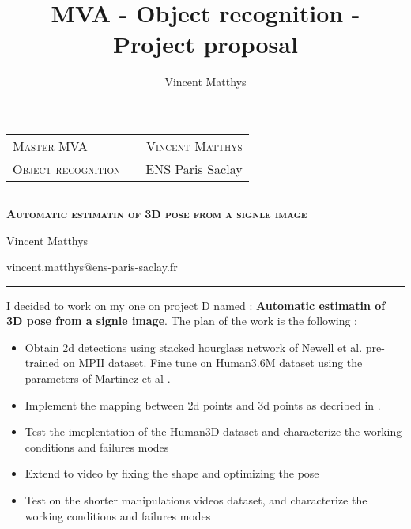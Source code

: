 \documentclass[12pt,a4paper,onecolumn]{article}
\title{MVA - Object recognition - Project proposal}
\author{Vincent Matthys}
\begin{document}
\begin{tabularx}{0.9\textwidth}{@{} l X r @{} }
	{\textsc{Master MVA}}       &  & \textsc{Vincent Matthys} \\
	\textsc{Object recognition} &  & {ENS Paris Saclay}       \\
\end{tabularx}
\vspace{1.5cm}
\begin{center}

	\rule[11pt]{5cm}{0.5pt}

	\textbf{\LARGE \textsc{Automatic estimatin of 3D pose from a signle image}}
	\vspace{0.5cm}

	Vincent Matthys

	vincent.matthys@ens-paris-saclay.fr

	\rule{5cm}{0.5pt}

	\vspace{1.5cm}
\end{center}

I decided to work on my one on project D named : \textbf{Automatic estimatin of 3D pose from a signle image}.
The plan of the work is the following :
\begin{itemize}
	\item Obtain 2d detections using stacked hourglass network of Newell et al. \cite{newell2016} pre-trained on MPII dataset. Fine tune on Human3.6M dataset using the parameters of Martinez et al \cite{martinez2017simple}.
	\item Implement the mapping between 2d points and 3d points as decribed in \cite{martinez2017simple}.
	\item Test the imeplentation of the Human3D dataset and characterize the working conditions and failures modes
	\item Extend to video by fixing the shape and optimizing the pose
	\item Test on the shorter manipulations videos dataset, and characterize the working conditions and failures modes
\end{itemize}

\printbibliography
\end{document}
